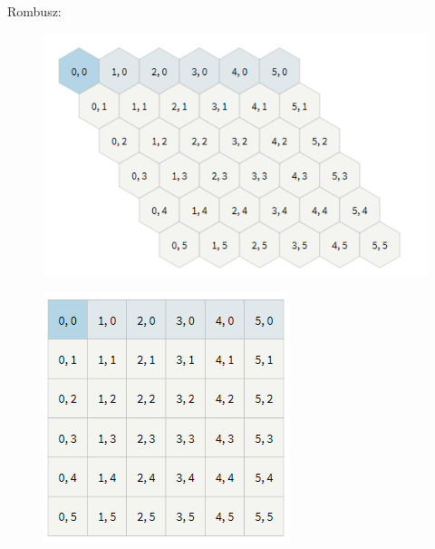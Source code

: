 \noindent Rombusz:
\begin{figure}[h]
\centering
\includegraphics[scale=0.5]{kepek/img_m7.png}
\caption{}
\label{fig:img_m7}
\end{figure}

\begin{figure}[h]
\centering
\includegraphics[scale=0.5]{kepek/img_m8.png}
\caption{}
\label{fig:img_m8}
\end{figure}